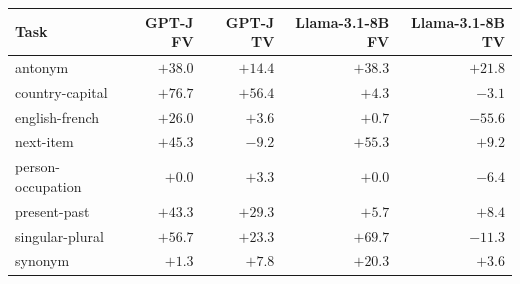 \begin{tabular}{lrrrr}
\toprule
Task & GPT-J FV & GPT-J TV & Llama-3.1-8B FV & Llama-3.1-8B TV \\
\midrule
antonym & $+38.0$ & $+14.4$ & $+38.3$ & $+21.8$ \\
country-capital & $+76.7$ & $+56.4$ & $+4.3$ & $-3.1$ \\
english-french & $+26.0$ & $+3.6$ & $+0.7$ & $-55.6$ \\
next-item & $+45.3$ & $-9.2$ & $+55.3$ & $+9.2$ \\
person-occupation & $+0.0$ & $+3.3$ & $+0.0$ & $-6.4$ \\
present-past & $+43.3$ & $+29.3$ & $+5.7$ & $+8.4$ \\
singular-plural & $+56.7$ & $+23.3$ & $+69.7$ & $-11.3$ \\
synonym & $+1.3$ & $+7.8$ & $+20.3$ & $+3.6$ \\
\bottomrule
\end{tabular}
